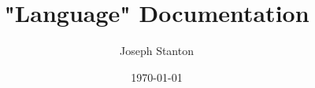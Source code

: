 \documentclass{report}
\title{"Language" Documentation}
\date{\today}
\author{Joseph Stanton}
\begin{document}
\maketitle
\tableofcontents







\begin{comment}
\chapter{Interpreter}
	\subsection{Executable Format}
	Currently the executable is just code. The interpreter simply starts at the beginning of the file and starts executing.
	This file format is reaching its limits. To avoid a huge mess, an alternate file format is going to be needed. 
	\subsection{Model}
	The interpreter, rather than being register based, is stack based. I went with a stack-based mode primarily for its ease of use and ease of development. 
\end{comment}


\begin{comment}
\chapter{Model of Computation}
	The interpreter is currently equivalent to a push down automata (it may be more powerful, but I'm not sure how to prove it). However, the compiler and language are currently equivalent to a finite state machine. This is do to the grammar not providing a mechanism for modifying the computational stack.
\end{comment}
\end{document}
